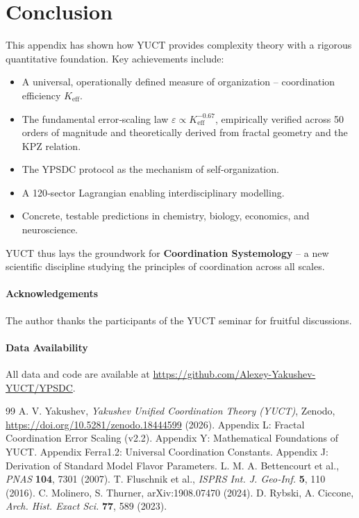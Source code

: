 \documentclass[11pt]{article}
\theoremstyle{remark}
\newcommand{\Keff}{K_{\mathrm{eff}}}
\begin{document}
	\section{Conclusion}
	\label{sec:conclusion}
	
	This appendix has shown how YUCT provides complexity theory with a rigorous quantitative foundation. Key achievements include:
	\begin{itemize}
		\item A universal, operationally defined measure of organization – coordination efficiency \(\Keff\).
		\item The fundamental error‑scaling law \(\varepsilon \propto \Keff^{-0.67}\), empirically verified across 50 orders of magnitude and theoretically derived from fractal geometry and the KPZ relation.
		\item The YPSDC protocol as the mechanism of self‑organization.
		\item A 120‑sector Lagrangian enabling interdisciplinary modelling.
		\item Concrete, testable predictions in chemistry, biology, economics, and neuroscience.
	\end{itemize}
	
	YUCT thus lays the groundwork for \textbf{Coordination Systemology} – a new scientific discipline studying the principles of coordination across all scales.
	
	\paragraph*{Acknowledgements}
	The author thanks the participants of the YUCT seminar for fruitful discussions.
	
	\paragraph*{Data Availability}
	All data and code are available at \url{https://github.com/Alexey-Yakushev-YUCT/YPSDC}.
	
	\begin{thebibliography}{99}
		 A. V. Yakushev, \emph{Yakushev Unified Coordination Theory (YUCT)}, Zenodo, \url{https://doi.org/10.5281/zenodo.18444599} (2026).
		 Appendix L: Fractal Coordination Error Scaling (v2.2).
		 Appendix Y: Mathematical Foundations of YUCT.
		 Appendix Ferra1.2: Universal Coordination Constants.
		 Appendix J: Derivation of Standard Model Flavor Parameters.
		 L. M. A. Bettencourt et al., \emph{PNAS} \textbf{104}, 7301 (2007).
		 T. Fluschnik et al., \emph{ISPRS Int. J. Geo‑Inf.} \textbf{5}, 110 (2016).
		 C. Molinero, S. Thurner, arXiv:1908.07470 (2024).
		 D. Rybski, A. Ciccone, \emph{Arch. Hist. Exact Sci.} \textbf{77}, 589 (2023).
	\end{thebibliography}
	
\end{document}
